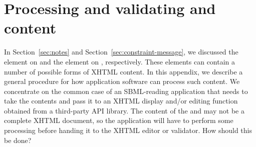 
\section{Processing and validating 
  and   content}
\label{apdx:processing-notes}

In Section~\ref{sec:notes} and
Section~\ref{sec:constraint-message}, we discussed the
 element on \SBase and the  element on
\Constraint, respectively.  These elements can contain a number of
possible forms of XHTML content.
In this appendix, we describe a general procedure for how
application software can process such content.  We concentrate on
the common case of an SBML-reading application that needs to take
the contents and pass it to an XHTML display and/or editing
function obtained from a third-party API library.  The content of
the  and  may not be a
complete XHTML document, so the
application will have to perform some processing before handing it
to the XHTML editor or validator.  How should this be done?

